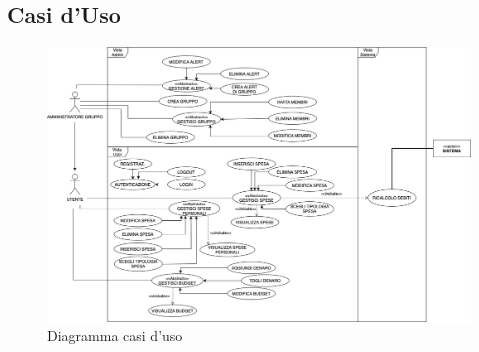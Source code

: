 \subsection{Casi d'Uso}

    \begin{figure}[h]
        \centering
        \includegraphics[scale=0.4]{images/DiagrammaCasiDusoV1.1.png}
        \caption{Diagramma casi d'uso }
    \end{figure}

